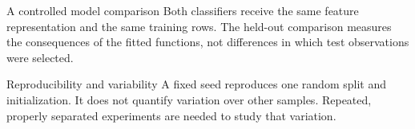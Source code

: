 \documentclass[aspectratio=169,11pt]{beamer}
\newcommand{\notestarget}{notes.pdf}\newcommand{\noteslabel}{Notes}
\begin{document}
\renewcommand{\notestarget}{notes.pdf\#note-a-controlled-model-comparison}
\begin{frame}[t,fragile,label=slide-a-controlled-model-comparison]{A controlled model comparison}
Both classifiers receive the same feature representation and the same training rows.
\pause{}
The held-out comparison measures the consequences of the fitted functions, not differences in which test observations were selected.
\end{frame}
\renewcommand{\notestarget}{notes.pdf\#note-a-controlled-model-comparison}
\begin{frame}[t,fragile,label=slide-reproducibility-and-variability]{Reproducibility and variability}
A fixed seed reproduces one random split and initialization.
\pause{}
It does not quantify variation over other samples. Repeated, properly separated experiments are needed to study that variation.
\end{frame}
\end{document}
